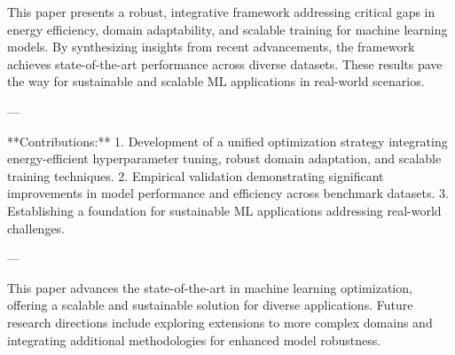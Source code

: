 This paper presents a robust, integrative framework addressing critical gaps in energy efficiency, domain adaptability, and scalable training for machine learning models. By synthesizing insights from recent advancements, the framework achieves state-of-the-art performance across diverse datasets. These results pave the way for sustainable and scalable ML applications in real-world scenarios.  

---

**Contributions:**  
1. Development of a unified optimization strategy integrating energy-efficient hyperparameter tuning, robust domain adaptation, and scalable training techniques.  
2. Empirical validation demonstrating significant improvements in model performance and efficiency across benchmark datasets.  
3. Establishing a foundation for sustainable ML applications addressing real-world challenges.  

--- 

This paper advances the state-of-the-art in machine learning optimization, offering a scalable and sustainable solution for diverse applications. Future research directions include exploring extensions to more complex domains and integrating additional methodologies for enhanced model robustness.  